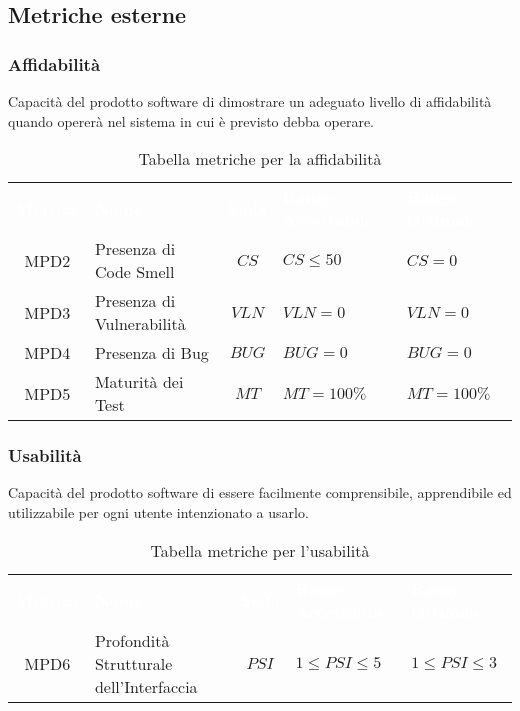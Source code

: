 \vspace{0.3cm}      
\subsection{Metriche esterne}

\subsubsection{Affidabilità}
Capacità del prodotto software di dimostrare un adeguato livello di affidabilità quando opererà nel sistema in cui è previsto debba operare.
\renewcommand{\arraystretch}{1.5}  
\begin{longtable}{ c C{4cm} c C{3.5cm} C{3.5cm}}
	\caption{Tabella metriche per la affidabilità}\\
	\textcolor{white}{\textbf{Metrica}} & \textcolor{white}{\textbf{Nome}} & \textcolor{white}{\textbf{Sigla}} & \textcolor{white}{\textbf{Range Accettabile}} & \textcolor{white}{\textbf{Range Ottimale}}\\
	MPD2 & Presenza di Code Smell & $CS$ & $CS \leq 50 $ & $CS = 0 $\\
	MPD3 & Presenza di Vulnerabilità & $VLN$ & $VLN = 0$ & $VLN = 0 $\\
	MPD4 & Presenza di Bug & $BUG$ & $BUG = 0 $ & $BUG = 0 $\\
	MPD5 & Maturità dei Test & $MT$ & $MT = 100\%$ & $MT = 100\%$\\
\end{longtable}
 
\subsubsection{Usabilità}
Capacità del prodotto software di essere facilmente comprensibile, apprendibile ed utilizzabile per ogni utente intenzionato a usarlo.
\renewcommand{\arraystretch}{1.5}  
\begin{longtable}{ c C{4cm} c C{3.5cm} C{3.5cm}}
	\caption{Tabella metriche per l'usabilità}\\
	\textcolor{white}{\textbf{Metrica}} & \textcolor{white}{\textbf{Nome}} & \textcolor{white}{\textbf{Sigla}} & \textcolor{white}{\textbf{Range Accettabile}} & \textcolor{white}{\textbf{Range Ottimale}}\\
	 MPD6 & Profondità Strutturale dell'Interfaccia & $PSI$ & $1 \leq PSI \leq 5$ &$1 \leq PSI \leq 3$\\
\end{longtable}

